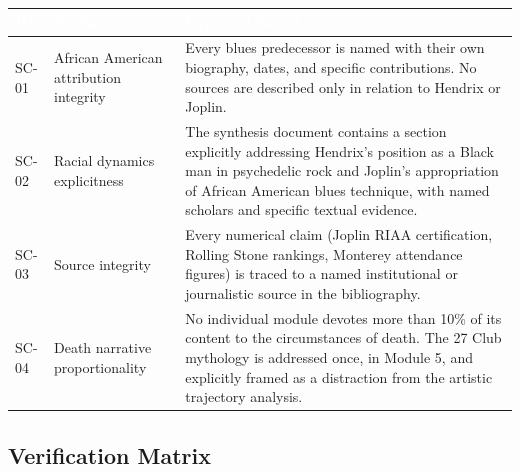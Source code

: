 \documentclass[11pt,letterpaper]{article}
\newcommand{\tableheader}[1]{\textbf{\sffamily\textcolor{white}{#1}}}
\begin{document}
\begin{center}
\begin{tabularx}{\textwidth}{C{1.5cm}L{4cm}X}
\toprule
{}
\tableheader{ID} & \tableheader{Verifies} & \tableheader{Expected Result} \\
\midrule
SC-01 & African American attribution integrity & Every blues predecessor is named with their own biography, dates, and specific contributions. No sources are described only in relation to Hendrix or Joplin. \\
SC-02 & Racial dynamics explicitness & The synthesis document contains a section explicitly addressing Hendrix's position as a Black man in psychedelic rock and Joplin's appropriation of African American blues technique, with named scholars and specific textual evidence. \\
SC-03 & Source integrity & Every numerical claim (Joplin RIAA certification, Rolling Stone rankings, Monterey attendance figures) is traced to a named institutional or journalistic source in the bibliography. \\
SC-04 & Death narrative proportionality & No individual module devotes more than 10\% of its content to the circumstances of death. The 27 Club mythology is addressed once, in Module 5, and explicitly framed as a distraction from the artistic trajectory analysis. \\
\bottomrule
\end{tabularx}
\end{center}

\subsection{Verification Matrix}
\end{document}
